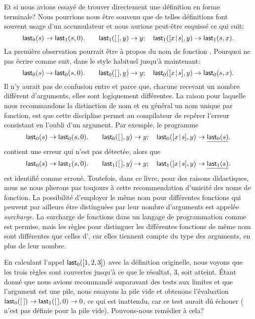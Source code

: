 Et si nous avions essayé de trouver directement une définition en
forme terminale? Nous pourrions nous être souvenu que de telles
définitions font souvent usage d'un accumulateur et nous aurions
peut-être esquissé ce qui suit:
\begin{equation*}
\textsf{last}_0(s) \rightarrow \textsf{last}_1(s,0).\qquad
\textsf{last}_1([\,],y) \rightarrow y;\quad
\textsf{last}_1([{x}\!\mid\!{s}],y) \rightarrow \textsf{last}_1(s,x).
\end{equation*}
La première observation pourrait être à propos du nom de fonction
. Pourquoi ne pas écrire comme suit, dans le style
habituel jusqu'à maintenant:
\begin{equation*}
\textsf{last}_0(s) \rightarrow \textsf{last}_0(s,0).\qquad
\textsf{last}_0([\,],y) \rightarrow y;\quad
\textsf{last}_0([{x}\!\mid\!{s}],y) \rightarrow \textsf{last}_0(s,x).
\end{equation*}
Il n'y aurait pas de confusion entre  et
 parce que, chacune recevant un nombre différent
d'arguments, elles sont logiquement différentes. La raison pour
laquelle nous recommandons la distinction de nom et en général un nom
unique par fonction, est que cette discipline permet au compilateur de
repérer l'erreur consistant en l'oubli d'un argument. Par exemple, le
programme
\begin{equation*}
\textsf{last}_0(s) \rightarrow \textsf{last}_0(s,0).\qquad
\textsf{last}_0([\,],y) \rightarrow y;\quad
\textsf{last}_0([{x}\!\mid\!{s}],y) \rightarrow \underline{\textsf{last}_0(s)}.
\end{equation*}
contient une erreur qui n'est pas détectée, alors que
\begin{equation*}
\textsf{last}_0(s) \rightarrow \textsf{last}_1(s,0).\qquad
\textsf{last}_1([\,],y) \rightarrow y;\quad
\textsf{last}_1([{x}\!\mid\!{s}],y) \rightarrow \underline{\textsf{last}_1(s)}.
\end{equation*}
est identifié comme erroné. Toutefois, dans ce livre, pour des raisons
didactiques, nous ne nous plierons pas toujours à cette recommendation
d'unicité des noms de fonction. La possibilité d'employer le même nom
pour différentes fonctions qui peuvent par ailleurs être distinguées
par leur nombre d'arguments est appelée \emph{surcharge}. La surcharge
de fonctions dans un langage de programmation comme \Cpp est permise,
mais les règles pour distinguer les différentes fonctions de même nom
sont différentes que celles d'\Erlang, car elles tiennent compte du
type des arguments, en plus de leur nombre.

En calculant l'appel \(\textsf{last}_0([1,2,3])\) avec la définition
originelle, nous voyons que les trois règles sont couvertes jusqu'à ce
que le résultat, \(3\), soit atteint. Étant donné que nous avions
recommandé auparavant des tests aux limites et que l'argument est une
pile, nous essayons la pile vide et obtenons l'évaluation
\(\textsf{last}_0([\,]) \rightarrow \textsf{last}_1([\,],0) \rightarrow 0\),
ce qui est inattendu, car ce test aurait dû échouer (
n'est pas définie pour la pile vide). Pouvons-nous remédier à cela?

